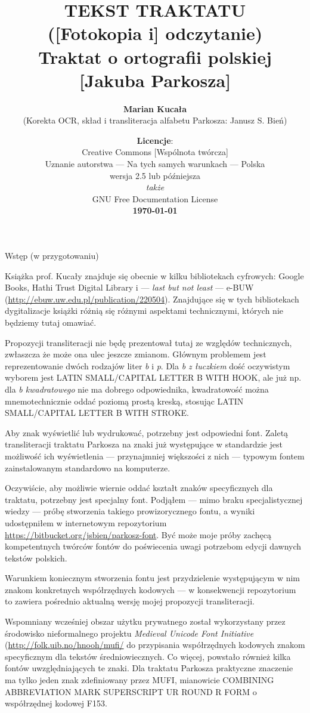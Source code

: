 \documentclass[dvipsnames,12pt]{article}
\author{\textbf{Marian Kucała}\\(Korekta OCR, skład i transliteracja alfabetu Parkosza: Janusz S. Bień)}
\title{TEKST TRAKTATU\\[-.5ex]([Fotokopia i] odczytanie)\\[-.5ex]Traktat o ortografii polskiej [Jakuba Parkosza]}
\date{\textbf{Licencje}:\\ \relsize{-1}Creative Commons [Wspólnota twórcza]\\[-.4ex]
Uznanie autorstwa --- Na tych samych warunkach --- Polska\\
wersja 2.5 lub późniejsza\\\textit{także}\\
GNU Free Documentation License\\
\textbf{\today}}
\begin{document}
\maketitle
\thispagestyle{empty}
\newpage

\begin{center}
  Wstęp (w przygotowaniu)
\end{center}

  Książka prof. Kucały \parencite*{TraktatPWN1985} znajduje się obecnie w
  kilku bibliotekach cyfrowych: Google Books, Hathi Trust Digital
  Library i --- \textit{last but not least} --- e-BUW
  (\url{http://ebuw.uw.edu.pl/publication/220504}). Znajdujące się w
  tych bibliotekach dygitalizacje książki różnią się różnymi aspektami
  technicznymi, których nie będziemy tutaj omawiać.

  
Propozycji transliteracji nie będę prezentował tutaj ze względów
technicznych, zwłaszcza że może ona ulec jeszcze zmianom. Głównym
problemem jest reprezentowanie dwóch rodzajów liter \textit{b} i
\textit{p}. Dla \textit{b z łuczkiem} dość oczywistym wyborem jest
LATIN SMALL/CAPITAL LETTER B WITH HOOK, ale już np. dla \textit{b
  kwadratowego} nie ma dobrego odpowiednika, kwadratowość można
mnemotechnicznie oddać poziomą prostą kreską, stosując LATIN SMALL/CAPITAL
LETTER B WITH STROKE.


Aby znak wyświetlić lub wydrukować, potrzebny jest odpowiedni
font. Zaletą transliteracji traktatu Parkosza na znaki już występujące
w standardzie jest możliwość ich wyświetlenia --- przynajmniej
większości z nich --- typowym fontem zainstalowanym standardowo na
komputerze.

Oczywiście, aby możliwie wiernie oddać kształt znaków specyficznych
dla traktatu, potrzebny jest specjalny font. Podjąłem --- mimo braku
specjalistycznej wiedzy --- próbę stworzenia takiego prowizorycznego
fontu, a wyniki udostępniłem w internetowym repozytorium
\url{https://bitbucket.org/jsbien/parkosz-font}. Być może moje próby
zachęcą kompetentnych twórców fontów do poświecenia uwagi potrzebom
edycji dawnych tekstów polskich.

Warunkiem koniecznym stworzenia fontu jest przydzielenie występującym
w nim znakom konkretnych współrzędnych kodowych --- w konsekwencji
repozytorium to zawiera pośrednio aktualną wersję mojej propozycji
transliteracji.

Wspomniany wcześniej obszar użytku prywatnego został wykorzystany
przez środowisko nieformalnego projektu \textit{Medieval Unicode Font
  Initiative} (\url{http://folk.uib.no/hnooh/mufi/} do przypisania
współrzędnych kodowych znakom specyficznym dla tekstów
średniowiecznych. Co więcej, powstało również kilka fontów
uwzględniających te znaki. Dla traktatu Parkosza praktyczne znaczenie
ma tylko jeden znak zdefiniowany przez MUFI, mianowicie COMBINING
ABBREVIATION MARK SUPERSCRIPT UR ROUND R FORM o współrzędnej kodowej
F153.
\end{document}
